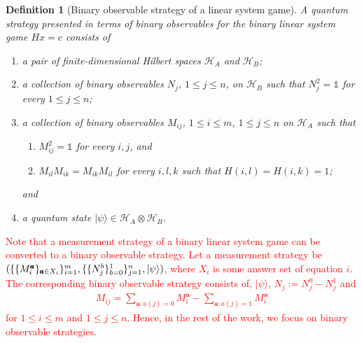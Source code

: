 \documentclass[11pt,letterpaper]{article}
\newcommand{\ket}[1]{|#1\rangle}
\newcommand{\x}{\otimes}
\newcommand{\calH}{\mathcal{H}}
\newcommand{\1}{\mathbb{1}}
\newcommand{\ba}{\pmb{a}}
\def\carl#1{{\color{blue} #1}}
\newcommand{\hf}[1]{\textcolor{red}{#1}}
\newtheorem{definition}[theorem]{Definition}
\theoremstyle{definition}
\begin{document}
\begin{definition}[Binary observable strategy of a linear system game]
\label{def:q_strat}
A quantum strategy presented in terms of binary observables for the binary linear system game $Hx = c$ consists of 
\begin{enumerate}
	\item a pair of finite-dimensional Hilbert spaces $\calH_A$ and $\calH_B$; 
	\item a collection of binary observables $N_j$, $1 \leq j \leq n$, on $\calH_B$
	such that $N_j^2 = \1$ for every $1 \leq j \leq n$; 
	\item a collection of binary observables $M_{ij}$, $1\leq i \leq m$, $1\leq j\leq n$ 
	on $\calH_A$ such that 
	\begin{enumerate}
		\item $M_{ij}^2 = \1$ for every $i,j$, and
		\item $M_{il}M_{ik} = M_{ik}M_{il}$ for every \carl{$i,l,k$ such that} $H(i,l) = H(i,k) =1$;
	\end{enumerate} 
	and
	\item a quantum state $\ket{\psi} \in \calH_A \x \calH_B$.
\end{enumerate}
\end{definition}
\hf{Note that a measurement strategy of a binary linear system game can be converted to a binary observable strategy. Let a  measurement strategy be 
$(\{\{M_i^{\ba}\}_{\ba \in X_i}\}_{i=1}^m, \{\{N_j^b\}_{b=0}^1\}_{j=1}^n,\\ \ket{\psi})$, where $X_i$ is some answer set of equation $i$.
The corresponding binary observable
strategy consists of, $\ket{\psi}$, $N_j := N_j^0 - N_j^1$ and
\begin{align*}
    M_{ij} = \sum_{\ba: a(j)=0} M_i^{\ba} - \sum_{\ba: a(j) =1}
    M_i^{\ba}
\end{align*}
for $1\leq i \leq m$ and $1 \leq j \leq n$. Hence, in the rest of the work, we focus on binary observable strategies.}

\end{document}
